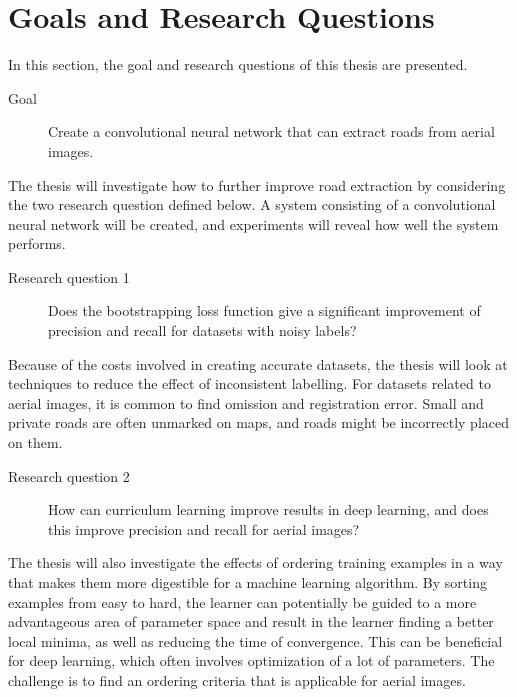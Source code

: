\section{Goals and Research Questions}
\label{sec:Goals and Research Questions}
In this section, the goal and research questions of this thesis are presented.

\begin{description}
\item[Goal] Create a convolutional neural network that can extract roads from aerial images.
\end{description}

The thesis will investigate how to further improve road extraction by considering the two research question defined below. A system consisting of a convolutional neural network will be created, and experiments will reveal how well the system performs.

\begin{description}
\item[Research question 1] Does the bootstrapping loss function give a significant improvement of precision and recall for datasets with noisy labels?
\end{description}

Because of the costs involved in creating accurate datasets, the thesis will look at techniques to reduce the effect of inconsistent labelling. For datasets related to aerial images, it is common to find omission and registration error. Small and private roads are often unmarked on maps, and roads might be incorrectly placed on them.


\begin{description}
\item[Research question 2]  How can curriculum learning improve results in deep learning, and does this improve precision and recall for aerial images?
\end{description}

The thesis will also investigate the effects of ordering training examples in a way that makes them more digestible for a machine learning algorithm. By sorting examples from easy to hard, the learner can potentially be guided to a more advantageous area of parameter space and result in the learner finding a better local minima, as well as reducing the time of convergence. This can be beneficial for deep learning, which often involves optimization of a lot of parameters. The challenge is to find an ordering criteria that is applicable for aerial images. 

